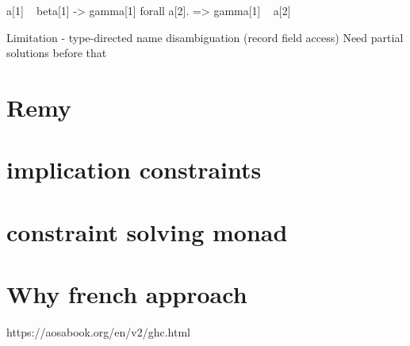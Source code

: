 
a[1] ~ beta[1] -> gamma[1]
forall a[2]. {} => gamma[1] ~ a[2]


Limitation - type-directed name disambiguation (record field access)
Need partial solutions before that


\section{Remy}



\section{implication constraints}


\section{constraint solving monad}




\section{Why french approach}

https://aosabook.org/en/v2/ghc.html


